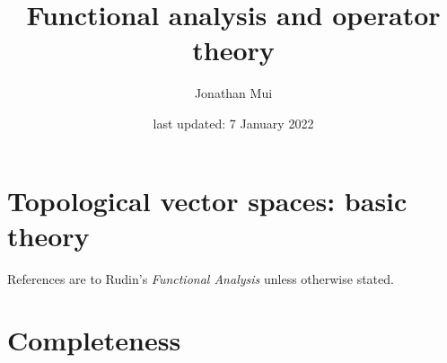 \documentclass[11pt]{article}
\title{Functional analysis and operator theory}
\author{Jonathan Mui}
\date{last updated: 7 January 2022}
\begin{document}
	
	\maketitle
	
	\section{Topological vector spaces: basic theory}
	References are to Rudin's \emph{Functional Analysis} unless otherwise stated.
	
	
	\section{Completeness}
	
	
\end{document}

